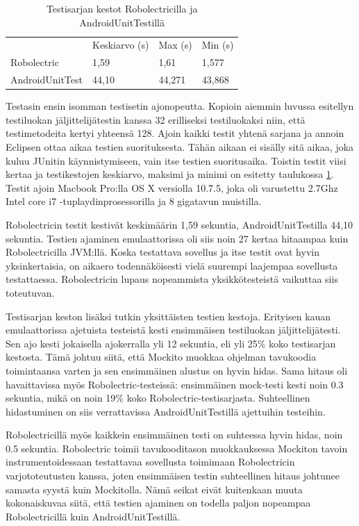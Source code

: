 \begin{table}[h]
\centering
\begin{tabular}{ l l l l }
   & Keskiarvo (s) & Max (s) & Min (s) \\
  Robolectric & 1,59 & 1,61 & 1,577 \\
  AndroidUnitTest & 44,10 & 44,271 & 43,868 \\
\end{tabular}
\caption{Testisarjan kestot Robolectricilla ja AndroidUnitTestillä}
\label{unittest_timing}
\end{table}

Testasin ensin isomman testisetin ajonopeutta. Kopioin aiemmin luvussa esitellyn testiluokan jäljittelijätestin kanssa 32 erilliseksi testiluokaksi niin, että testimetodeita kertyi yhteensä 128. Ajoin kaikki testit yhtenä sarjana ja annoin Eclipsen ottaa aikaa testien suorituksesta. Tähän aikaan ei sisälly sitä aikaa, joka kuluu JUnitin käynnistymiseen, vain itse testien suoritusaika. Toistin testit viisi kertaa ja testikestojen keskiarvo, maksimi ja minimi on esitetty taulukossa \ref{unittest_timing}. Testit ajoin Macbook Pro:lla OS X versiolla 10.7.5, joka oli varustettu 2.7Ghz Intel core i7 -tuplaydinprosessorilla ja 8 gigatavun muistilla.

Robolectricin testit kestivät keskimäärin 1,59 sekuntia, AndroidUnitTestilla 44,10 sekuntia. Testien ajaminen emulaattorissa oli siis noin 27 kertaa hitaampaa kuin Robolectricilla JVM:llä. Koska testattava sovellus ja itse testit ovat hyvin yksinkertaisia, on aikaero todennäköisesti vielä suurempi laajempaa sovellusta testattaessa. Robolectricin lupaus nopeammista yksikkötesteistä vaikuttaa siis toteutuvan.

Testisarjan keston lisäksi tutkin yksittäisten testien kestoja. Erityisen kauan emulaattorissa ajetuista testeistä kesti ensimmäisen testiluokan jäljittelijätesti. Sen ajo kesti jokaisella ajokerralla yli 12 sekuntia, eli yli 25\% koko testisarjan kestosta. Tämä johtuu siitä, että Mockito muokkaa ohjelman tavukoodia toimintaansa varten ja sen ensimmäinen alustus on hyvin hidas. Sama hitaus oli havaittavissa myös Robolectric-testeissä: ensimmäinen mock-testi kesti noin 0.3 sekuntia, mikä on noin 19\% koko Robolectric-testisarjasta. Suhteellinen hidastuminen on siis verrattavissa AndroidUnitTestillä ajettuihin testeihin.

Robolectricillä myös kaikkein ensimmäinen testi on suhteessa hyvin hidas, noin 0.5 sekuntia. Robolectric toimii tavukooditason muokkauksessa Mockiton tavoin instrumentoidessaan testattavaa sovellusta toimimaan Robolectricin varjototeutusten kanssa, joten ensimmäisen testin suhteellinen hitaus johtunee samasta syystä kuin Mockitolla.
Nämä seikat eivät kuitenkaan muuta kokonaiskuvaa siitä, että testien ajaminen on todella paljon nopeampaa Robolectricillä kuin AndroidUnitTestillä.

